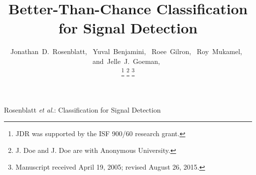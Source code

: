 \documentclass[onecolumn,draftclsnofoot]{IEEEtran}
\begin{document}
\title{Better-Than-Chance Classification for Signal Detection}
%
%
%

\author{Jonathan~D.~Rosenblatt,~
        Yuval~Benjamini,~
        Roee~Gilron,~
        Roy~Mukamel,~
        and~Jelle~J.~Goeman,~%

\thanks{JDR was supported by the ISF 900/60 research grant.}%
\thanks{J. Doe and J. Doe are with Anonymous University.}%
\thanks{Manuscript received April 19, 2005; revised August 26, 2015.}}

% 
%



\markboth{}%
{Rosenblatt \MakeLowercase{\textit{et al.}}: Classification for Signal Detection}



\end{document}
